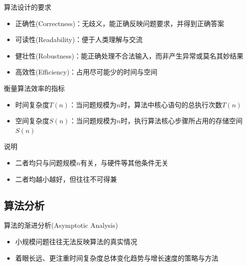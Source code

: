 \begin{frame}{\insertsubsectionhead}
    \begin{block}{算法设计的要求}
        \begin{itemize}
            \item 正确性(Correctness)：无歧义，能正确反映问题要求，并得到正确答案
            \item 可读性(Readability)：便于人类理解与交流
            \item 健壮性(Robustness)：能正确处理不合法输入，而非产生异常或莫名其妙结果
            \item 高效性(Efficiency)：占用尽可能少的时间与空间
        \end{itemize}
    \end{block}
\end{frame}

\begin{frame}{\insertsubsectionhead}
    \begin{block}{衡量算法效率的指标}
        \begin{itemize}
            \item 时间复杂度$T(n)$：当问题规模为$n$时，算法中核心语句的总执行次数$T(n)$
            \item 空间复杂度$S(n)$：当问题规模为$n$时，执行算法核心步骤所占用的存储空间$S(n)$
        \end{itemize}
    \end{block}
    \pause
    \begin{exampleblock}{说明}
        \begin{itemize}
            \item 二者均只与问题规模$n$有关，与硬件等其他条件无关
            \item 二者均越小越好，但往往不可得兼
        \end{itemize}
    \end{exampleblock}
\end{frame}

\subsection{算法分析}

\begin{frame}{\insertsubsectionhead}
    \begin{block}{算法的渐进分析(Asymptotic Analysis)}
        \begin{itemize}
            \item 小规模问题往往无法反映算法的真实情况
            \item 着眼\alert{长远}、更注重时间复杂度总体变化\alert{趋势}与增长速度的策略与方法
        \end{itemize}
    \end{block}
\end{frame}

